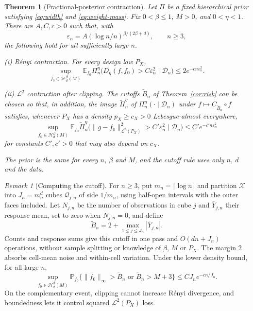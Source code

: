 \documentclass[11pt,a4paper]{article}
\newtheorem{theorem}{Theorem}
\theoremstyle{remark}
\newtheorem{remark}{Remark}
\newcommand{\Xcal}{\mathcal X}
\newcommand{\Hcal}{\mathcal H}
\newcommand{\Dcal}{\mathcal D}
\newcommand{\Lcal}{\mathcal L}
\newcommand{\PP}{\mathbb P}
\newcommand{\E}{\mathbb E}
\newcommand{\norm}[1]{\lVert#1\rVert}
\begin{document}
\begin{theorem}[Fractional-posterior contraction]\label{thm:main}
Let $\Pi$ be a fixed hierarchical prior satisfying
\eqref{eq:width} and \eqref{eq:weight-mass}. Fix $0<\beta\leq1$,
$M>0$, and $0<\eta<1$. There are $A,C,c>0$ such that, with
\begin{equation}\label{eq:rate}
\varepsilon_n=A(\log n/n)^{\beta/(2\beta+d)},\qquad n\geq3,
\end{equation}
the following hold for all sufficiently large $n$.

\textup{(i)} \emph{R\'enyi contraction.} For every design law $P_X$,
\begin{equation}\label{eq:renyi-result}
\sup_{f_0\in\Hcal_d^\beta(M)}\E_{f_0}\Pi_n^\eta
\bigl(D_\eta(f,f_0)>C\varepsilon_n^2\mid\Dcal_n\bigr)
\leq2e^{-cn\varepsilon_n^2}.
\end{equation}

\textup{(ii)} \emph{$\Lcal^2$ contraction after clipping.} The
cutoffs $\widetilde B_n$ of Theorem~\ref{cor:risk} can be chosen so
that, in addition, the image $\widetilde\Pi_n^\eta$ of
$\Pi_n^\eta(\cdot\mid\Dcal_n)$ under
$f\mapsto C_{\widetilde B_n}\circ f$ satisfies, whenever $P_X$ has a density $p_X\geq c_X>0$
Lebesgue-almost everywhere,
\begin{equation}\label{eq:l2-result}
\sup_{f_0\in\Hcal_d^\beta(M)}\E_{f_0}\widetilde\Pi_n^\eta
\bigl(\norm{g-f_0}_{\Lcal^2(P_X)}^2>C'\varepsilon_n^2
\mid\Dcal_n\bigr)\leq C'e^{-c'n\varepsilon_n^2}
\end{equation}
for constants $C',c'>0$ that may also depend on $c_X$.

The prior is the same for every $n$, $\beta$ and $M$, and the cutoff
rule uses only $n$, $d$ and the data.
\end{theorem}

\begin{remark}[Computing the cutoff]\label{rem:clipping-construction}
For $n\geq3$, put $m_n=\lceil\log n\rceil$ and partition
$\Xcal$ into $J_n=m_n^d$ cubes $\mathcal Q_{j,n}$ of side
$1/m_n$, using half-open intervals with the outer faces included.
Let $N_{j,n}$ be the number of observations in cube $j$ and
$\overline Y_{j,n}$ their response mean, set to zero when
$N_{j,n}=0$, and define
\begin{equation}\label{eq:adaptive-clipping}
\widetilde B_n=2+\max_{1\leq j\leq J_n}|\overline Y_{j,n}|.
\end{equation}
Counts and response sums give this cutoff in one pass and
$O(dn+J_n)$ operations, without sample splitting or knowledge of
$\beta$, $M$ or $P_X$. The margin $2$ absorbs cell-mean noise and
within-cell variation. Under the lower density bound, for all large
$n$,
\[
\sup_{f_0\in\Hcal_d^\beta(M)}
\PP_{f_0}\{\norm{f_0}_\infty>\widetilde B_n
\text{ or }\widetilde B_n>M+3\}\leq CJ_ne^{-cn/J_n}.
\]
On the complementary event, clipping cannot increase R\'enyi
divergence, and boundedness lets it control squared
$\Lcal^2(P_X)$ loss.
\end{remark}
\end{document}
